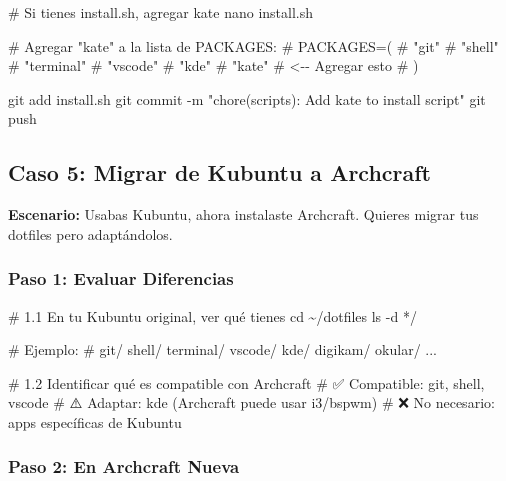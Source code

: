 \documentclass[
  doc,
  floatsintext,
  longtable,
  a4paper,
  nolmodern,
  notxfonts,
  notimes,
  12pt,
  colorlinks=true,linkcolor=blue,citecolor=blue,urlcolor=blue]{apa7}
\newenvironment{Shaded}{\begin{snugshade}}{\end{snugshade}}
\newcommand{\AttributeTok}[1]{\textcolor[rgb]{0.40,0.45,0.13}{#1}}
\newcommand{\BuiltInTok}[1]{\textcolor[rgb]{0.00,0.23,0.31}{#1}}
\newcommand{\CommentTok}[1]{\textcolor[rgb]{0.37,0.37,0.37}{#1}}
\newcommand{\FunctionTok}[1]{\textcolor[rgb]{0.28,0.35,0.67}{#1}}
\newcommand{\NormalTok}[1]{\textcolor[rgb]{0.00,0.23,0.31}{#1}}
\newcommand{\PreprocessorTok}[1]{\textcolor[rgb]{0.68,0.00,0.00}{#1}}
\newcommand{\StringTok}[1]{\textcolor[rgb]{0.13,0.47,0.30}{#1}}
\begin{document}
\begin{Shaded}
\begin{Highlighting}[]
\CommentTok{\# Si tienes install.sh, agregar kate}
\FunctionTok{nano}\NormalTok{ install.sh}

\CommentTok{\# Agregar "kate" a la lista de PACKAGES:}
\CommentTok{\# PACKAGES=(}
\CommentTok{\#     "git"}
\CommentTok{\#     "shell"}
\CommentTok{\#     "terminal"}
\CommentTok{\#     "vscode"}
\CommentTok{\#     "kde"}
\CommentTok{\#     "kate"        \# \textless{}{-}{-} Agregar esto}
\CommentTok{\# )}

\FunctionTok{git}\NormalTok{ add install.sh}
\FunctionTok{git}\NormalTok{ commit }\AttributeTok{{-}m} \StringTok{"chore(scripts): Add kate to install script"}
\FunctionTok{git}\NormalTok{ push}
\end{Highlighting}
\end{Shaded}

\subsection{Caso 5: Migrar de Kubuntu a
Archcraft}\label{caso-5-migrar-de-kubuntu-a-archcraft}

\textbf{Escenario:} Usabas Kubuntu, ahora instalaste Archcraft. Quieres
migrar tus dotfiles pero adaptándolos.

\subsubsection{Paso 1: Evaluar
Diferencias}\label{paso-1-evaluar-diferencias}

\begin{Shaded}
\begin{Highlighting}[]
\CommentTok{\# 1.1 En tu Kubuntu original, ver qué tienes}
\BuiltInTok{cd}\NormalTok{ \textasciitilde{}/dotfiles}
\FunctionTok{ls} \AttributeTok{{-}d} \PreprocessorTok{*}\NormalTok{/}

\CommentTok{\# Ejemplo:}
\CommentTok{\# git/ shell/ terminal/ vscode/ kde/ digikam/ okular/ ...}

\CommentTok{\# 1.2 Identificar qué es compatible con Archcraft}
\CommentTok{\# ✅ Compatible: git, shell, vscode}
\CommentTok{\# ⚠️  Adaptar: kde (Archcraft puede usar i3/bspwm)}
\CommentTok{\# ❌ No necesario: apps específicas de Kubuntu}
\end{Highlighting}
\end{Shaded}

\subsubsection{Paso 2: En Archcraft
Nueva}\label{paso-2-en-archcraft-nueva}
\end{document}
